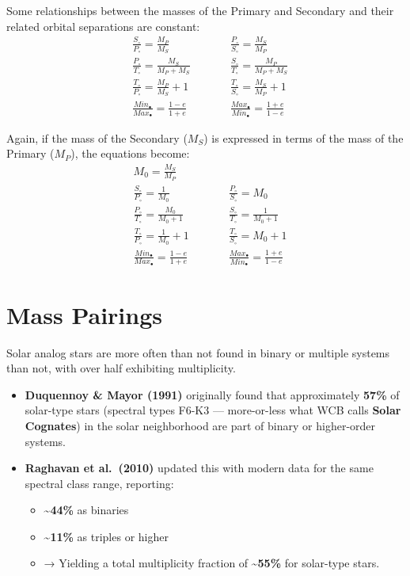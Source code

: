 \documentclass[
  letterpaper,
]{book}
\providecommand{\tightlist}{%
  \setlength{\itemsep}{0pt}\setlength{\parskip}{0pt}}
\begin{document}
Some relationships between the masses of the Primary and Secondary and
their related orbital separations are constant: \[
\begin{align}
&\frac{S_\circ}{P_\circ} = \frac{M_P}{M_S} \qquad
&&\frac{P_\circ}{S_\circ} = \frac{M_S}{M_P} \\[1em]
&\frac{P_\circ}{T_\circ} = \frac{M_S}{M_P + M_S}   \qquad
&&\frac{S_\circ}{T_\circ} = \frac{M_P}{M_P + M_S} \\[1em]
&\frac{T_\circ}{P_\circ} = \frac{M_P}{M_S} + 1   \qquad
&&\frac{T_\circ}{S_\circ} = \frac{M_S}{M_P} + 1 \\[3em]
&\frac{Min_\bullet}{Max_\bullet} = \frac{1 - e}{1 + e} \qquad
&&\frac{Max_\bullet}{Min_\bullet} = \frac{1 + e}{1 - e}
\end{align}
\]

Again, if the mass of the Secondary (\(M_S\)) is expressed in terms of
the mass of the Primary (\(M_P\)), the equations become: \[
\begin{align}
&M_0 = \frac{M_S}{M_P} \\[1em]
&\frac{S_\circ}{P_\circ} = \frac{1}{M_0} \qquad
&&\frac{P_\circ}{S_\circ} = M_0 \\[1em]
&\frac{P_\circ}{T_\circ} = \frac{M_0}{M_0 + 1}   \qquad
&&\frac{S_\circ}{T_\circ} = \frac{1}{M_0 + 1} \\[1em]
&\frac{T_\circ}{P_\circ} = \frac{1}{M_0} + 1   \qquad
&&\frac{T_\circ}{S_\circ} = M_0 + 1 \\[3em]
&\frac{Min_\bullet}{Max_\bullet} = \frac{1 - e}{1 + e} \qquad
&&\frac{Max_\bullet}{Min_\bullet} = \frac{1 + e}{1 - e}
\end{align}
\]

\section{Mass Pairings}\label{mass-pairings}

Solar analog stars are more often than not found in binary or multiple
systems than not, with over half exhibiting multiplicity.

\begin{itemize}
\tightlist
\item
  \textbf{Duquennoy \& Mayor (1991)} originally found that approximately
  \textbf{57\%} of solar-type stars (spectral types F6-K3 ---
  more-or-less what WCB calls \textbf{Solar Cognates}) in the solar
  neighborhood are part of binary or higher-order systems.
\item
  \textbf{Raghavan et al.~(2010)} updated this with modern data for the
  same spectral class range, reporting:

  \begin{itemize}
  \tightlist
  \item
    \textbf{\textasciitilde44\%} as binaries\\
  \item
    \textbf{\textasciitilde11\%} as triples or higher\\
  \item
    → Yielding a total multiplicity fraction of
    \textbf{\textasciitilde55\%} for solar-type stars.
  \end{itemize}
\end{itemize}
\end{document}
